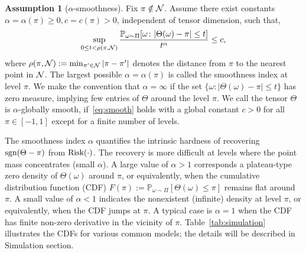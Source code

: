 \documentclass{article}
\theoremstyle{plain}
\theoremstyle{definition}
\newtheorem{assumption}{Assumption}
\def\sign{\textup{sgn}}
\def\risk{\textup{Risk}}
\begin{document}
\begin{assumption}[$\alpha$-smoothness]\label{ass:margin} 
Fix $\pi\notin \mathcal{N}$. Assume there exist constants $\alpha=\alpha(\pi)\geq 0, c=c(\pi) >0$, independent of tensor dimension, such that, 
\begin{equation}\label{eq:smooth}
\sup_{0\leq t<\rho(\pi, \mathcal{N})}{\mathbb{P}_{\omega \sim \Pi}[\omega \colon |\Theta (\omega)-\pi|\leq t ]\over t^\alpha} \leq c,
\end{equation}
where $\rho(\pi,\mathcal{N}):=\min_{\pi'\in \mathcal{N}}|\pi-\pi'|$ denotes the distance from $\pi$ to the nearest point in $\mathcal{N}$. The largest possible $\alpha=\alpha(\pi)$ is called the smoothness index at level $\pi$. We make the convention that $\alpha= \infty$ if the set $\{\omega\colon |\Theta(\omega)-\pi|\leq t\}$ has zero measure, implying few entries of $\Theta$ around the level $\pi$. We call the tensor $\Theta$ is $\alpha$-globally smooth, if~\eqref{eq:smooth} holds with a global constant $c>0$ for all $\pi\in[-1,1]$ except for a finite number of levels. 
\end{assumption}

The smoothness index $\alpha$ quantifies the intrinsic hardness of recovering $\sign(\Theta-\pi)$ from $\risk(\cdot)$. %
The recovery is more difficult at levels where the point mass concentrates (small $\alpha$). A large value of $\alpha>1$ corresponds a plateau-type zero density of $\Theta(\omega)$ around $\pi$, or equivalently, when the cumulative distribution function (CDF) $F(\pi):=\mathbb{P}_{\omega\sim \Pi}[\Theta(\omega)\leq \pi]$ remains flat around $\pi$. A small value of $\alpha<1$ indicates the nonexistent (infinite) density at level $\pi$, or equivalently, when the CDF jumps at $\pi$.  A typical case is $\alpha=1$ when the CDF has finite non-zero derivative in the vicinity of $\pi$. Table~\ref{tab:simulation} illustrates the CDFs for various common models; the details will be described in Simulation section. 
\end{document}
